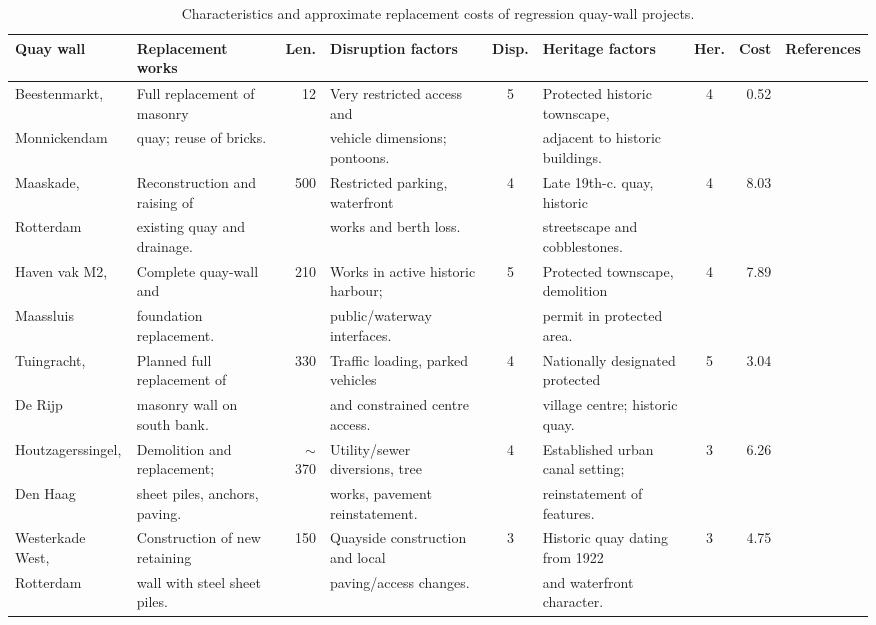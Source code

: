 \begin{table}[htbp]
\centering
\tiny
\caption{Characteristics and approximate replacement costs of regression quay-wall projects.}
\label{tab:dutch-quay-walls}
\setlength{\tabcolsep}{3pt}
\renewcommand{\arraystretch}{1.2}
\begin{tabular}{@{} l l r l c l c r l @{}}
\toprule
Quay wall & Replacement works & Len. & Disruption factors & Disp. & Heritage factors & Her. & Cost & References \\
\midrule
Beestenmarkt, & Full replacement of masonry & 12 & Very restricted access and & 5 & Protected historic townscape, & 4 & 0.52 & \cite{waterland2025,} \\
Monnickendam & quay; reuse of bricks. & & vehicle dimensions; pontoons. & & adjacent to historic buildings. & & & \cite{kdekker2025} \\
\addlinespace
Maaskade, & Reconstruction and raising of & 500 & Restricted parking, waterfront & 4 & Late 19th-c. quay, historic & 4 & 8.03 & \cite{maaskadeaward2018,} \\
Rotterdam & existing quay and drainage. & & works and berth loss. & & streetscape and cobblestones.  \\
\addlinespace
Haven vak M2, & Complete quay-wall and & 210 & Works in active historic harbour; & 5 & Protected townscape, demolition & 4 & 7.89 & \cite{maassluis2026,} \\
Maassluis & foundation replacement. & & public/waterway interfaces. & & permit in protected area. & & & \\
\addlinespace
Tuingracht, & Planned full replacement of & 330 & Traffic loading, parked vehicles & 4 & Nationally designated protected & 5 & 3.04 & \cite{alkmaarMIP,} \\
De Rijp & masonry wall on south bank. & & and constrained centre access. & & village centre; historic quay. & & & \cite{tuingrachtTender} \\
\addlinespace
Houtzagerssingel, & Demolition and replacement; & $\sim$370 & Utility/sewer diversions, tree & 4 & Established urban canal setting; & 3 & 6.26 & \cite{houtzagersTender,} \\
Den Haag & sheet piles, anchors, paving. & & works, pavement reinstatement. & & reinstatement of features. & & & \cite{houtzagersContractor} \\
\addlinespace
Westerkade West, & Construction of new retaining & 150 & Quayside construction and local & 3 & Historic quay dating from 1922 & 3 & 4.75 & \cite{westerkadeTender,} \\
Rotterdam & wall with steel sheet piles. & & paving/access changes. & & and waterfront character. & & & \cite{westerkadeContractor} \\
\bottomrule
\end{tabular}
\end{table}

